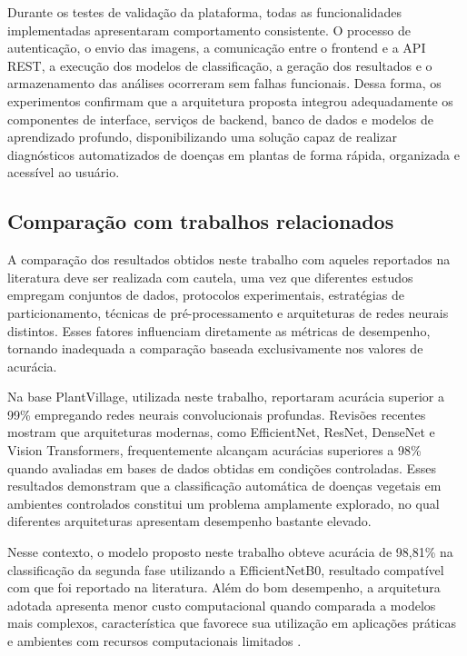 \documentclass[portuguese]{sbc2025}%
\begin{document}
Durante os testes de validação da plataforma, todas as funcionalidades implementadas apresentaram comportamento consistente. 
O processo de autenticação, o envio das imagens, a comunicação entre o frontend e a API REST, a execução dos modelos de 
classificação, a geração dos resultados e o armazenamento das análises ocorreram sem falhas funcionais. Dessa forma, os 
experimentos confirmam que a arquitetura proposta integrou adequadamente os componentes de interface, serviços de backend, 
banco de dados e modelos de aprendizado profundo, disponibilizando uma solução capaz de realizar diagnósticos automatizados 
de doenças em plantas de forma rápida, organizada e acessível ao usuário.


\subsection{Comparação com trabalhos relacionados}

A comparação dos resultados obtidos neste trabalho com aqueles reportados na literatura deve ser realizada com cautela, uma
vez que diferentes estudos empregam conjuntos de dados, protocolos experimentais, estratégias de particionamento, técnicas 
de pré-processamento e arquiteturas de redes neurais distintos. Esses fatores influenciam diretamente as métricas de desempenho,
tornando inadequada a comparação baseada exclusivamente nos valores de acurácia.

Na base PlantVillage, utilizada neste trabalho, \cite{ref1} reportaram acurácia superior a 99\% empregando redes neurais 
convolucionais profundas. Revisões recentes \citep{ref2,ref3,ref5} mostram que arquiteturas modernas, como EfficientNet, ResNet,
DenseNet e Vision Transformers, frequentemente alcançam acurácias superiores a 98\% quando avaliadas em bases de dados obtidas 
em condições controladas. Esses resultados demonstram que a classificação automática de doenças vegetais em ambientes controlados 
constitui um problema amplamente explorado, no qual diferentes arquiteturas apresentam desempenho bastante elevado.

Nesse contexto, o modelo proposto neste trabalho obteve acurácia de 98,81\% na classificação da segunda fase utilizando a 
EfficientNetB0, resultado compatível com que foi reportado na literatura. Além do bom desempenho, a arquitetura adotada apresenta
menor custo computacional quando comparada a modelos mais complexos, característica que favorece sua utilização em aplicações 
práticas e ambientes com recursos computacionais limitados \citep{ref4}.
\end{document}
